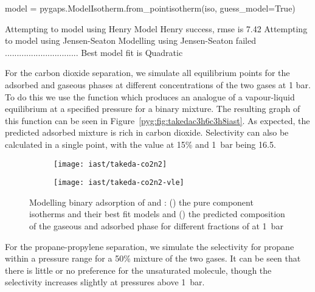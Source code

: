 \begin{python}[caption={Guessing the best model},label={lst:model}]
model = pygaps.ModelIsotherm.from_pointisotherm(iso, guess_model=True)
\end{python}
\begin{pythonout}
Attempting to model using Henry
Model Henry success, rmse is 7.42
Attempting to model using Jensen-Seaton
Modelling using Jensen-Seaton failed
...............................
Best model fit is Quadratic
\end{pythonout}

For the carbon dioxide separation, we simulate all equilibrium 
points for the adsorbed and gaseous phases at different concentrations 
of the two gases at 1 bar. To do this we use the 
function which produces an analogue of a vapour-liquid equilibrium at 
a specified pressure for a binary mixture. The resulting graph of this
function can be seen in Figure~\ref{pyg:fig:takedac3h6c3h8iast}.
As expected, the predicted adsorbed mixture is rich in carbon dioxide.
Selectivity can also be calculated in a single point, with the value at 
15\%  and \SI{1}{bar} being 16.5. 

\begin{figure}[htb]

    \centering
    \begin{subfigure}[b]{.5\textwidth}
        \centering
        \texttt{[image: iast/takeda-co2n2]}
        \caption{}%
        \label{pyg:fig:takedaco2n2iso}
    \end{subfigure}%
    \begin{subfigure}[b]{.5\textwidth}
        \centering
        \texttt{[image: iast/takeda-co2n2-vle]}
        \caption{}%
        \label{pyg:fig:takedaco2n2iast}
    \end{subfigure}
    \caption{
    Modelling binary adsorption of  and : 
    (\protect{}) the pure component
    isotherms and their best fit models and 
    (\protect{}) 
    the predicted composition of the gaseous
    and adsorbed phase for different fractions of 
     at \SI{1}{\bar}
    }%
    \label{pyg:fig:takedaco2n2}

\end{figure}

For the propane-propylene separation, we simulate the selectivity for
propane within a pressure range for a 50\% mixture of the two gases. 
It can be seen that there is little or no preference for the 
unsaturated molecule, though the selectivity increases slightly at 
pressures above \SI{1}{\bar}.

